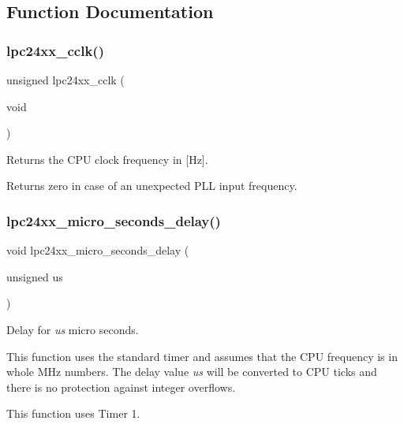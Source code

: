 \subsection{Function Documentation}
\mbox{\label{group__lpc24xx__clock_ga1f89dbcdb26c1d4fe517abf6691f3a91}} 
\subsubsection{\texorpdfstring{lpc24xx\_cclk()}{lpc24xx\_cclk()}}
{\footnotesize\ttfamily unsigned lpc24xx\+\_\+cclk (\begin{DoxyParamCaption}\item[{void}]{ }\end{DoxyParamCaption})}



Returns the C\+PU clock frequency in \mbox{[}Hz\mbox{]}. 

Returns zero in case of an unexpected P\+LL input frequency. \mbox{\label{group__lpc24xx__clock_gac1fffb9076567b431b33ef1028873a78}} 
\subsubsection{\texorpdfstring{lpc24xx\_micro\_seconds\_delay()}{lpc24xx\_micro\_seconds\_delay()}}
{\footnotesize\ttfamily void lpc24xx\+\_\+micro\+\_\+seconds\+\_\+delay (\begin{DoxyParamCaption}\item[{unsigned}]{us }\end{DoxyParamCaption})}



Delay for {\itshape us} micro seconds. 

This function uses the standard timer and assumes that the C\+PU frequency is in whole M\+Hz numbers. The delay value {\itshape us} will be converted to C\+PU ticks and there is no protection against integer overflows.

This function uses Timer 1. \mbox{\label{group__lpc24xx__clock_ga985f11224a9ca5c881d6a7da40eb1b97}} 
